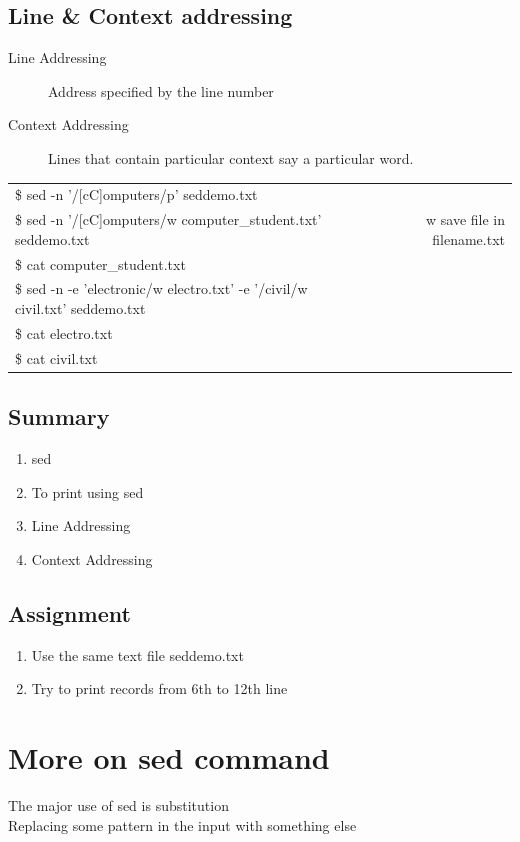 \documentclass[12pt, a4paper]{report}
\begin{document}
\section{Line \& Context addressing}
\begin{description}
\item[Line Addressing]Address specified by the line number
\item[Context Addressing]Lines that contain particular context say a particular word.
\end{description}
\begin{tabular}{|lcr|}\hline
\$ sed -n '/[cC]omputers/p' seddemo.txt && \\
\$ sed -n '/[cC]omputers/w computer\_student.txt' seddemo.txt	&& w save file in filename.txt \\
\$ cat computer\_student.txt && \\
\$ sed -n -e 'electronic/w electro.txt' -e '/civil/w civil.txt' seddemo.txt && \\
\$ cat electro.txt && \\
\$ cat civil.txt && \\ \hline
\end{tabular}
\section{Summary}
\begin{enumerate}
\item sed
\item To print using sed
\item Line Addressing
\item Context Addressing
\end{enumerate}
\section{Assignment}
\begin{enumerate}
\item Use the same text file seddemo.txt
\item Try to print records from 6th to 12th line
\end{enumerate}
\chapter{More on sed command}
The major use of sed is substitution\\
Replacing some pattern in the input with something else
\end{document}
